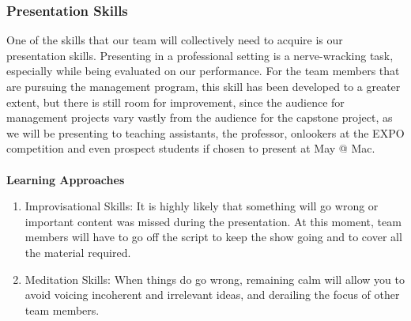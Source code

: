 \documentclass[12pt,letterpaper]{article}
\begin{document}
\subsubsection{Presentation Skills}
One of the skills that our team will collectively need to acquire is our presentation skills. Presenting in a professional setting is a nerve-wracking task, especially while being evaluated on our performance. For the team members that are pursuing the management program, this skill has been developed to a greater extent, but there is still room for improvement, since the audience for management projects vary vastly from the audience for the capstone project, as we will be presenting to teaching assistants, the professor, onlookers at the EXPO competition and even prospect students if chosen to present at May @ Mac.
\\
\\
\noindent \textbf{Learning Approaches}
\begin{enumerate}
    \item Improvisational Skills: It is highly likely that something will go wrong or important content was missed during the presentation. At this moment, team members will have to go off the script to keep the show going and to cover all the material required. 
    \item Meditation Skills: When things do go wrong, remaining calm will allow you to avoid voicing incoherent and irrelevant ideas, and derailing the focus of other team members.
\end{enumerate}
\end{document}

